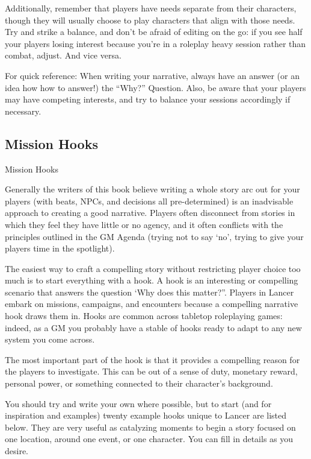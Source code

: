 Additionally, remember that players have needs separate from their characters, though they will
usually choose to play characters that align with those needs. Try and strike a balance, and don’t
be afraid of editing on the go: if you see half your players losing interest because you’re in a
roleplay heavy session rather than combat, adjust. And vice versa.


For quick reference: When writing your narrative, always have an answer (or an idea how how to
answer!) the “Why?” Question. Also, be aware that your players may have competing interests,
and try to balance your sessions accordingly if necessary.



\subsection{Mission Hooks}

                                           Mission Hooks

Generally the writers of this book believe writing a whole story arc out for your players (with
beats, NPCs, and decisions all pre-determined) is an inadvisable approach to creating a good
narrative. Players often disconnect from stories in which they feel they have little or no agency,
and it often conflicts with the principles outlined in the GM Agenda (trying not to say ‘no’, trying
to give your players time in the spotlight).


The easiest way to craft a compelling story without restricting player choice too much is to start
everything with a hook. A hook is an interesting or compelling scenario that answers the
question ‘Why does this matter?”. Players in Lancer embark on missions, campaigns, and
encounters because a compelling narrative hook draws them in. Hooks are common across
tabletop roleplaying games: indeed, as a GM you probably have a stable of hooks ready to adapt
to any new system you come across.


The most important part of the hook is that it provides a compelling reason for the players
to investigate. This can be out of a sense of duty, monetary reward, personal power, or
something connected to their character’s background.


You should try and write your own where possible, but to start (and for inspiration and examples)
twenty example hooks unique to Lancer are listed below. They are very useful as catalyzing
moments to begin a story focused on one location, around one event, or one character. You can
fill in details as you desire.


